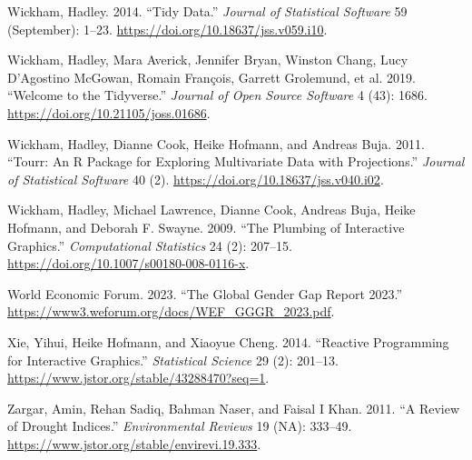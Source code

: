 \documentclass[
]{interact}
\newlength{\cslhangindent}
\newenvironment{CSLReferences}[2] %
 {\begin{list}{}{%
  \setlength{\itemindent}{0pt}
  \setlength{\leftmargin}{0pt}
  \setlength{\parsep}{0pt}
  \ifodd #1
   \setlength{\leftmargin}{\cslhangindent}
   \setlength{\itemindent}{-1\cslhangindent}
  \fi
  \setlength{\itemsep}{#2\baselineskip}}}
 {\end{list}}
\begin{document}
\begin{CSLReferences}{1}{0}
Wickham, Hadley. 2014. {``Tidy {Data}.''} \emph{Journal of Statistical
Software} 59 (September): 1--23.
\url{https://doi.org/10.18637/jss.v059.i10}.

Wickham, Hadley, Mara Averick, Jennifer Bryan, Winston Chang, Lucy
D'Agostino McGowan, Romain François, Garrett Grolemund, et al. 2019.
{``Welcome to the {Tidyverse}.''} \emph{Journal of Open Source Software}
4 (43): 1686. \url{https://doi.org/10.21105/joss.01686}.

Wickham, Hadley, Dianne Cook, Heike Hofmann, and Andreas Buja. 2011.
{``Tourr: {An} {R} {Package} for {Exploring} {Multivariate} {Data} with
{Projections}.''} \emph{Journal of Statistical Software} 40 (2).
\url{https://doi.org/10.18637/jss.v040.i02}.

Wickham, Hadley, Michael Lawrence, Dianne Cook, Andreas Buja, Heike
Hofmann, and Deborah F. Swayne. 2009. {``The Plumbing of Interactive
Graphics.''} \emph{Computational Statistics} 24 (2): 207--15.
\url{https://doi.org/10.1007/s00180-008-0116-x}.

World Economic Forum. 2023. {``{The Global Gender Gap Report 2023}.''}
\url{https://www3.weforum.org/docs/WEF_GGGR_2023.pdf}.

Xie, Yihui, Heike Hofmann, and Xiaoyue Cheng. 2014. {``Reactive
{Programming} for {Interactive} {Graphics}.''} \emph{Statistical
Science} 29 (2): 201--13.
\url{https://www.jstor.org/stable/43288470?seq=1}.

Zargar, Amin, Rehan Sadiq, Bahman Naser, and Faisal I Khan. 2011. {``A
Review of Drought Indices.''} \emph{Environmental Reviews} 19 (NA):
333--49. \url{https://www.jstor.org/stable/envirevi.19.333}.

\end{CSLReferences}
\end{document}
